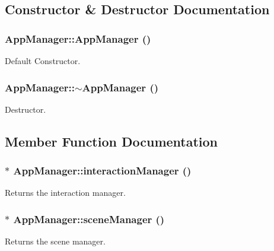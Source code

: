 \subsection{Constructor \& Destructor Documentation}
\hypertarget{class_app_manager_a6221fc1ede71f2ac539c052bbe0c7f6a}{
\subsubsection[{AppManager}]{\setlength{\rightskip}{0pt plus 5cm}AppManager::AppManager ()}}
\label{class_app_manager_a6221fc1ede71f2ac539c052bbe0c7f6a}
Default Constructor. \hypertarget{class_app_manager_aee444cb63c8febdbf5ea3fcbf1a90836}{
\subsubsection[{$\sim$AppManager}]{\setlength{\rightskip}{0pt plus 5cm}AppManager::$\sim$AppManager ()}}
\label{class_app_manager_aee444cb63c8febdbf5ea3fcbf1a90836}
Destructor. 

\subsection{Member Function Documentation}
\hypertarget{class_app_manager_ae275684d47ade6cea794d26d6fbfd6ae}{
\subsubsection[{interactionManager}]{$\ast$ AppManager::interactionManager ()}}
\label{class_app_manager_ae275684d47ade6cea794d26d6fbfd6ae}
Returns the interaction manager. \hypertarget{class_app_manager_a6b5b1ca7d03db568e57104fcdd25c7e6}{
\subsubsection[{sceneManager}]{$\ast$ AppManager::sceneManager ()}}
\label{class_app_manager_a6b5b1ca7d03db568e57104fcdd25c7e6}
Returns the scene manager. 

